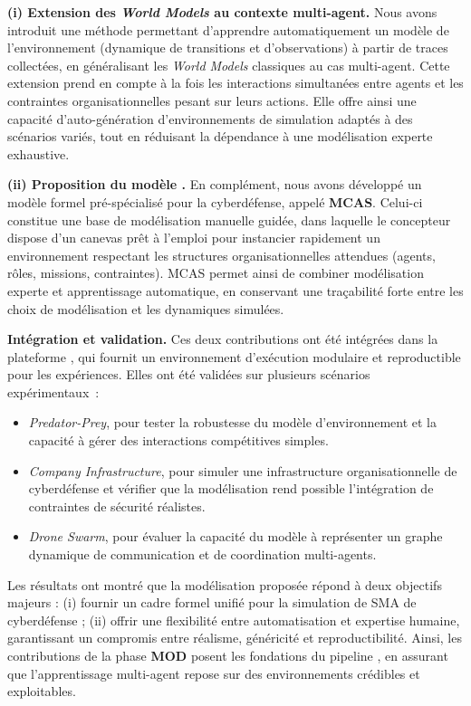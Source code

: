 \medskip
\noindent
\textbf{(i) Extension des \textit{World Models} au contexte multi-agent.}
Nous avons introduit une méthode permettant d’apprendre automatiquement un modèle de l’environnement (dynamique de transitions et d’observations) à partir de traces collectées, en généralisant les \textit{World Models} classiques au cas multi-agent.
Cette extension prend en compte à la fois les interactions simultanées entre agents et les contraintes organisationnelles pesant sur leurs actions.
Elle offre ainsi une capacité d’auto-génération d’environnements de simulation adaptés à des scénarios variés, tout en réduisant la dépendance à une modélisation experte exhaustive.

\medskip
\noindent
\textbf{(ii) Proposition du modèle .}
En complément, nous avons développé un modèle formel  pré-spécialisé pour la cyberdéfense, appelé \textbf{MCAS}.
Celui-ci constitue une base de modélisation manuelle guidée, dans laquelle le concepteur dispose d’un canevas prêt à l’emploi pour instancier rapidement un environnement respectant les structures organisationnelles attendues (agents, rôles, missions, contraintes).
MCAS permet ainsi de combiner modélisation experte et apprentissage automatique, en conservant une traçabilité forte entre les choix de modélisation et les dynamiques simulées.

\medskip
\noindent
\textbf{Intégration et validation.}
Ces deux contributions ont été intégrées dans la plateforme , qui fournit un environnement d’exécution modulaire et reproductible pour les expériences.
Elles ont été validées sur plusieurs scénarios expérimentaux~:
\begin{itemize}
  \item \textit{Predator-Prey}, pour tester la robustesse du modèle d’environnement et la capacité à gérer des interactions compétitives simples.
  \item \textit{Company Infrastructure}, pour simuler une infrastructure organisationnelle de cyberdéfense et vérifier que la modélisation rend possible l’intégration de contraintes de sécurité réalistes.
  \item \textit{Drone Swarm}, pour évaluer la capacité du modèle à représenter un graphe dynamique de communication et de coordination multi-agents.
\end{itemize}

\noindent
Les résultats ont montré que la modélisation proposée répond à deux objectifs majeurs :
(i) fournir un cadre formel unifié pour la simulation de SMA de cyberdéfense ;
(ii) offrir une flexibilité entre automatisation et expertise humaine, garantissant un compromis entre réalisme, généricité et reproductibilité.
Ainsi, les contributions de la phase \textbf{MOD} posent les fondations du pipeline , en assurant que l’apprentissage multi-agent repose sur des environnements crédibles et exploitables.


